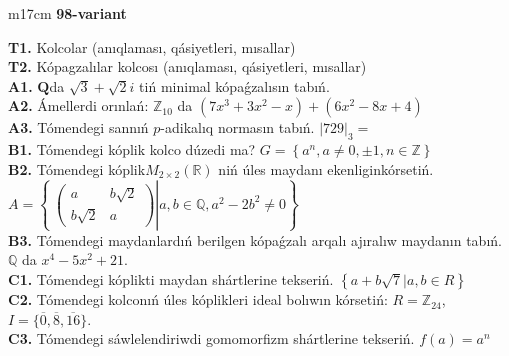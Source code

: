 \documentclass{article}
\begin{document}
\begin{tabular}{m{17cm}}
\textbf{98-variant}
\newline

\textbf{T1.} Kolcolar (anıqlaması, qásiyetleri, mısallar) \\
\textbf{T2.} Kópagzalılar kolcosı (anıqlaması, qásiyetleri, mısallar) \\
\textbf{A1.} \(\mathbf{Q}\)da \(\sqrt{3} + \sqrt{2}i\) tiń minimal kópaǵzalısın tabıń. \\
\textbf{A2.} Ámellerdi orınlań: \(\mathbb{Z}_{10}\) da \(\left( 7x^{3} + 3x^{2} - x \right) + \left( 6x^{2} - 8x + 4 \right)\) \\
\textbf{A3.} Tómendegi sannıń \(p\)-adikalıq normasın tabıń. \(|729|_{3} =\) \\
\textbf{B1.} Tómendegi kóplik kolco dúzedi ma? \(G = \left\{ a^{n},a \neq 0, \pm 1,n \in \mathbb{Z} \right\}\) \\
\textbf{B2.} Tómendegi kóplik\(M_{2 \times 2}\left( \mathbb{R} \right)\) niń úles maydanı ekenliginkórsetiń. \(A = \left\{ \left. \ \begin{pmatrix}
a & b\sqrt{2} \\
b\sqrt{2} & a
\end{pmatrix} \right|a,b\mathbb{\in Q},a^{2} - 2b^{2} \neq 0 \right\}\) \\
\textbf{B3.} Tómendegi maydanlardıń berilgen kópaǵzalı arqalı ajıralıw maydanın tabıń.
\(\mathbb{Q}\) da \(x^{4} - 5x^{2} + 21\). \\
\textbf{C1.} Tómendegi kóplikti maydan shártlerine tekseriń. \(\left\{ a + b\sqrt{7}|a,b \in R \right\}\) \\
\textbf{C2.} Tómendegi kolconıń úles kóplikleri ideal bolıwın kórsetiń:
\(R = \mathbb{Z}_{24}\), \(I = \{\overline{0},\overline{8},\overline{16}\}\). \\
\textbf{C3.} Tómendegi sáwlelendiriwdi gomomorfizm shártlerine tekseriń. \(f(a) = a^{n}\) \\

\end{tabular}
\vspace{1cm}
\end{document}
